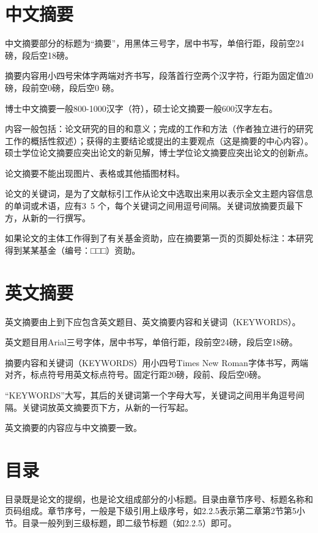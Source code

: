 \section{中文摘要}
中文摘要部分的标题为“摘要”，用黑体三号字，居中书写，单倍行距，段前空24磅，段后空18磅。

摘要内容用小四号宋体字两端对齐书写，段落首行空两个汉字符，行距为固定值20磅，段前空0磅，段后空0 磅。

博士中文摘要一般800-1000汉字（符），硕士论文摘要一般600汉字左右。

内容一般包括：论文研究的目的和意义；完成的工作和方法（作者独立进行的研究工作的概括性叙述）；获得的主要结论或提出的主要观点（这是摘要的中心内容）。硕士学位论文摘要应突出论文的新见解，博士学位论文摘要应突出论文的创新点。

论文摘要不能出现图片、表格或其他插图材料。

论文的关键词，是为了文献标引工作从论文中选取出来用以表示全文主题内容信息的单词或术语，应有3~5 个，每个关键词之间用逗号间隔。关键词放摘要页最下方，从新的一行撰写。

如果论文的主体工作得到了有关基金资助，应在摘要第一页的页脚处标注：本研究得到某某基金（编号：□□□）资助。

{\color{red}{英文培养项目学生使用英文写学位论文，中文摘要应不少于6000字。}}

{\color{red}{Students of the English Training Program are required to write their dissertations in English, and their Chinese abstracts should be no less than 6,000 Chinese characters.}}



\section{英文摘要}
英文摘要由上到下应包含英文题目、英文摘要内容和关键词（KEYWORDS）。

英文题目用Arial三号字体，居中书写，单倍行距，段前空24磅，段后空18磅。

摘要内容和关键词（KEYWORDS）用小四号Times New Roman字体书写，两端对齐，标点符号用英文标点符号。固定行距20磅，段前、段后空0磅。

“KEYWORDS”大写，其后的关键词第一个字母大写，关键词之间用半角逗号间隔。关键词放英文摘要页下方，从新的一行写起。

英文摘要的内容应与中文摘要一致。

\section{目录}
目录既是论文的提纲，也是论文组成部分的小标题。目录由章节序号、标题名称和页码组成。章节序号，一般是下级引用上级序号，如2.2.5表示第二章第2节第5小节。目录一般列到三级标题，即二级节标题（如2.2.5）即可。

